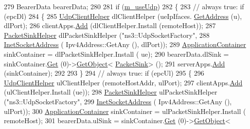 \begin{DoxyCode}
279               BearerData bearerData;
280 
281               \textcolor{keywordflow}{if} (\hyperlink{classLteX2HandoverTestCase_a70c8ee7faf2c84d6bad133cca4665fb4}{m\_useUdp})
282                 \{              
283                   \textcolor{comment}{// always true: if (epcDl)}
284                     \{
285                       \hyperlink{classns3_1_1UdpClientHelper}{UdpClientHelper} dlClientHelper (ueIpIfaces.
      \hyperlink{classns3_1_1Ipv4InterfaceContainer_ae63208dcd222be986822937ee4aa828c}{GetAddress} (u), dlPort);
286                       clientApps.\hyperlink{classns3_1_1ApplicationContainer_ad09ab1a1ad5849d518d5f4c262e38152}{Add} (dlClientHelper.Install (remoteHost));
287                       \hyperlink{classns3_1_1PacketSinkHelper}{PacketSinkHelper} dlPacketSinkHelper (\textcolor{stringliteral}{"ns3::UdpSocketFactory"}, 
288                                                            \hyperlink{classns3_1_1InetSocketAddress}{InetSocketAddress} (
      Ipv4Address::GetAny (), dlPort));
289                       \hyperlink{classns3_1_1ApplicationContainer}{ApplicationContainer} sinkContainer = dlPacketSinkHelper.Install (
      ue);
290                       bearerData.dlSink = sinkContainer.\hyperlink{classns3_1_1ApplicationContainer_a9e565807abd4213a56566a7ccd8d7509}{Get} (0)->\hyperlink{classns3_1_1Object_a13e18c00017096c8381eb651d5bd0783}{GetObject}<
      \hyperlink{classns3_1_1PacketSink}{PacketSink}> ();
291                       serverApps.\hyperlink{classns3_1_1ApplicationContainer_ad09ab1a1ad5849d518d5f4c262e38152}{Add} (sinkContainer);
292                       
293                     \}
294                   \textcolor{comment}{// always true: if (epcUl)}
295                     \{      
296                       \hyperlink{classns3_1_1UdpClientHelper}{UdpClientHelper} ulClientHelper (remoteHostAddr, ulPort);
297                       clientApps.\hyperlink{classns3_1_1ApplicationContainer_ad09ab1a1ad5849d518d5f4c262e38152}{Add} (ulClientHelper.Install (ue));
298                       \hyperlink{classns3_1_1PacketSinkHelper}{PacketSinkHelper} ulPacketSinkHelper (\textcolor{stringliteral}{"ns3::UdpSocketFactory"}, 
299                                                            \hyperlink{classns3_1_1InetSocketAddress}{InetSocketAddress} (
      Ipv4Address::GetAny (), ulPort));
300                       \hyperlink{classns3_1_1ApplicationContainer}{ApplicationContainer} sinkContainer = ulPacketSinkHelper.Install (
      remoteHost);
301                       bearerData.ulSink = sinkContainer.\hyperlink{classns3_1_1ApplicationContainer_a9e565807abd4213a56566a7ccd8d7509}{Get} (0)->\hyperlink{classns3_1_1Object_a13e18c00017096c8381eb651d5bd0783}{GetObject}<

\end{DoxyCode}

